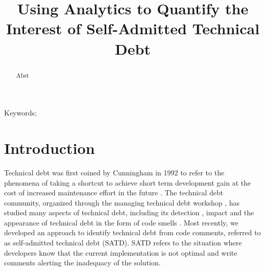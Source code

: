 \documentclass[10pt, conference]{IEEEtran}
\begin{document}
\title{Using Analytics to Quantify the Interest of Self-Admitted Technical Debt}




\author{

\and
{}

\and
{}

\and
{}
}


\maketitle


\begin{abstract}
Abst


\end{abstract}

\begin{IEEEkeywords}
Keywords;

\end{IEEEkeywords}

\IEEEpeerreviewmaketitle

\section{Introduction}
Technical debt was first coined by Cunningham in 1992 to refer to the phenomena of taking a shortcut to achieve short term development gain at the cost of increased maintenance effort in the future \cite{Cunningham1992WPM}. The technical debt community, organized through the managing technical debt workshop \cite{MTD2016}, has studied many aspects of technical debt, including its detection \cite{Zazworka2013EASE}, impact \cite{Zazworka2011MTD} and the appearance of technical debt in the form of code smells \cite{Fontana2012MTD}. Most recently, we developed an approach to identify technical debt from code comments, referred to as self-admitted technical debt (SATD). SATD refers to the situation where developers know that the current implementation is not optimal and write comments alerting the inadequacy of the solution. 
\end{document}
